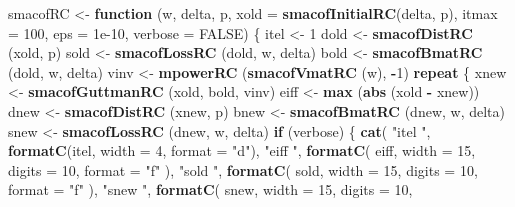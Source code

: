 \documentclass[12pt,]{article}
\newenvironment{Shaded}{\begin{snugshade}}{\end{snugshade}}
\newcommand{\KeywordTok}[1]{\textcolor[rgb]{0.13,0.29,0.53}{\textbf{#1}}}
\newcommand{\DataTypeTok}[1]{\textcolor[rgb]{0.13,0.29,0.53}{#1}}
\newcommand{\DecValTok}[1]{\textcolor[rgb]{0.00,0.00,0.81}{#1}}
\newcommand{\FloatTok}[1]{\textcolor[rgb]{0.00,0.00,0.81}{#1}}
\newcommand{\StringTok}[1]{\textcolor[rgb]{0.31,0.60,0.02}{#1}}
\newcommand{\OtherTok}[1]{\textcolor[rgb]{0.56,0.35,0.01}{#1}}
\newcommand{\ControlFlowTok}[1]{\textcolor[rgb]{0.13,0.29,0.53}{\textbf{#1}}}
\newcommand{\OperatorTok}[1]{\textcolor[rgb]{0.81,0.36,0.00}{\textbf{#1}}}
\newcommand{\NormalTok}[1]{#1}
\begin{document}
\begin{Shaded}
\begin{Highlighting}[]
\NormalTok{smacofRC <-}
\StringTok{  }\ControlFlowTok{function}\NormalTok{ (w,}
\NormalTok{            delta,}
\NormalTok{            p,}
            \DataTypeTok{xold =} \KeywordTok{smacofInitialRC}\NormalTok{(delta, p),}
            \DataTypeTok{itmax =} \DecValTok{100}\NormalTok{,}
            \DataTypeTok{eps =} \FloatTok{1e-10}\NormalTok{,}
            \DataTypeTok{verbose =} \OtherTok{FALSE}\NormalTok{) \{}
\NormalTok{    itel <-}\StringTok{ }\DecValTok{1}
\NormalTok{    dold <-}\StringTok{ }\KeywordTok{smacofDistRC}\NormalTok{ (xold, p)}
\NormalTok{    sold <-}\StringTok{ }\KeywordTok{smacofLossRC}\NormalTok{ (dold, w, delta)}
\NormalTok{    bold <-}\StringTok{ }\KeywordTok{smacofBmatRC}\NormalTok{ (dold, w, delta)}
\NormalTok{    vinv <-}\StringTok{ }\KeywordTok{mpowerRC}\NormalTok{ (}\KeywordTok{smacofVmatRC}\NormalTok{ (w), }\OperatorTok{-}\DecValTok{1}\NormalTok{)}
    \ControlFlowTok{repeat}\NormalTok{ \{}
\NormalTok{      xnew <-}\StringTok{ }\KeywordTok{smacofGuttmanRC}\NormalTok{ (xold, bold, vinv)}
\NormalTok{      eiff <-}\StringTok{ }\KeywordTok{max}\NormalTok{ (}\KeywordTok{abs}\NormalTok{ (xold }\OperatorTok{-}\StringTok{ }\NormalTok{xnew))}
\NormalTok{      dnew <-}\StringTok{ }\KeywordTok{smacofDistRC}\NormalTok{ (xnew, p)}
\NormalTok{      bnew <-}\StringTok{ }\KeywordTok{smacofBmatRC}\NormalTok{ (dnew, w, delta)}
\NormalTok{      snew <-}\StringTok{ }\KeywordTok{smacofLossRC}\NormalTok{ (dnew, w, delta)}
      \ControlFlowTok{if}\NormalTok{ (verbose) \{}
        \KeywordTok{cat}\NormalTok{(}
          \StringTok{"itel "}\NormalTok{,}
          \KeywordTok{formatC}\NormalTok{(itel, }\DataTypeTok{width =} \DecValTok{4}\NormalTok{, }\DataTypeTok{format =} \StringTok{"d"}\NormalTok{),}
          \StringTok{"eiff "}\NormalTok{,}
          \KeywordTok{formatC}\NormalTok{(}
\NormalTok{            eiff,}
            \DataTypeTok{width =} \DecValTok{15}\NormalTok{,}
            \DataTypeTok{digits =} \DecValTok{10}\NormalTok{,}
            \DataTypeTok{format =} \StringTok{"f"}
\NormalTok{          ),}
          \StringTok{"sold "}\NormalTok{,}
          \KeywordTok{formatC}\NormalTok{(}
\NormalTok{            sold,}
            \DataTypeTok{width =} \DecValTok{15}\NormalTok{,}
            \DataTypeTok{digits =} \DecValTok{10}\NormalTok{,}
            \DataTypeTok{format =} \StringTok{"f"}
\NormalTok{          ),}
          \StringTok{"snew "}\NormalTok{,}
          \KeywordTok{formatC}\NormalTok{(}
\NormalTok{            snew,}
            \DataTypeTok{width =} \DecValTok{15}\NormalTok{,}
            \DataTypeTok{digits =} \DecValTok{10}\NormalTok{,}

\end{Highlighting}
\end{Shaded}
\end{document}
